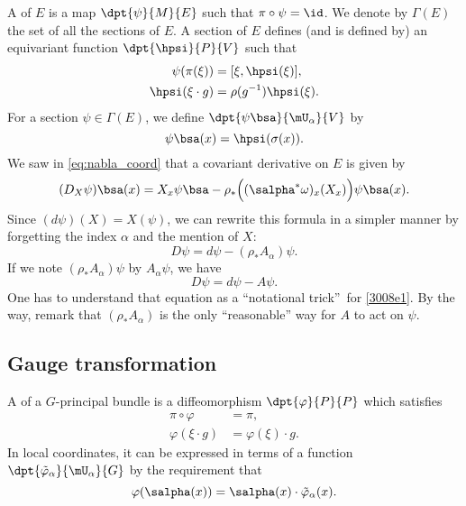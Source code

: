 A  of $E$ is a map $\dpt{\psi}{M}{E}$ such that $\pi\circ\psi=\id$. We denote by $\Gamma(E)$ the set of all the sections of $E$. A section of $E$ defines (and is defined by) an equivariant function $\dpt{\hpsi}{P}{V}$ such that
\begin{subequations}
	\begin{align}
		\psi(\pi(\xi))    & =[\xi,\hpsi(\xi)],       \\
		\hpsi(\xi\cdot g) & =\rho(g^{-1})\hpsi(\xi).
	\end{align}
\end{subequations}
For a section $\psi\in\Gamma(E)$, we define $\dpt{\psi\bsa}{\mU_{\alpha}}{V}$ by
\[
	\psi\bsa(x)=\hpsi(\sigma(x)).
\]
We saw in \eqref{eq:nabla_coord} that a covariant derivative on $E$ is given by
\begin{equation}\label{3008e1}
	(D_X\psi)\bsa(x)=X_x\psi\bsa-\rho_*\Big((\salpha^*\omega)_x(X_x)\Big)\psi\bsa(x).
\end{equation}
Since $(d\psi)(X)=X(\psi)$, we can rewrite this formula in a simpler manner by forgetting the index $\alpha$ and the mention of $X$:
\[
	D\psi=d\psi-(\rho_*A_{\alpha})\psi.
\]
If we note $(\rho_*A_{\alpha})\psi$ by $A_{\alpha}\psi$, we have
\begin{equation}
	D\psi=d\psi-A\psi.
\end{equation}
One has to understand that equation as a ``notational trick''\ for \eqref{3008e1}. By the way, remark that $(\rho_*A_{\alpha})$ is the only ``reasonable'' way for $A$ to act on $\psi$.

\subsection{Gauge transformation}

A  of a $G$-principal bundle is a diffeomorphism $\dpt{\varphi}{P}{P}$ which satisfies
\begin{subequations}
	\begin{align}
		\pi\circ\varphi     & =\pi,                 \\
		\varphi(\xi\cdot g) & =\varphi(\xi)\cdot g.
	\end{align}
\end{subequations}
In local coordinates, it can be expressed in terms of a function $\dpt{\tilde{\varphi}_{\alpha}}{\mU_{\alpha}}{G}$ by the requirement that
\begin{equation}\label{def_vpt}
	\varphi(\salpha(x))=\salpha(x)\cdot\tilde{\varphi}_{\alpha}(x).
\end{equation}


